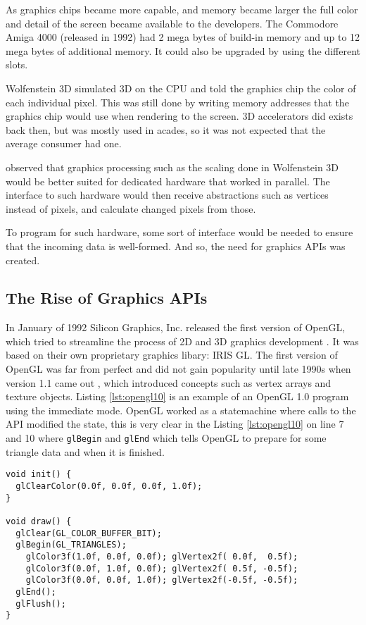 As graphics chips became more capable, and memory became larger the full color and detail of the screen became available to the developers.
The Commodore Amiga 4000 (released in 1992) had 2 mega bytes of build-in memory and up to 12 mega bytes of additional memory.
It could also be upgraded by using the different slots.

Wolfenstein 3D simulated 3D on the \gls{CPU} and told the graphics chip the color of each individual pixel.
This was still done by writing memory addresses that the graphics chip would use when rendering to the screen.
3D accelerators did exists back then, but was mostly used in acades, so it was not expected that the average consumer had one.

 observed that graphics processing such as the scaling done in Wolfenstein 3D would be better suited for dedicated hardware that worked in parallel.
The interface to such hardware would then receive abstractions such as vertices instead of pixels, and calculate changed pixels from those.

To program for such hardware, some sort of interface would be needed to ensure that the incoming data is well-formed.
And so, the need for graphics \glspl{API} was created.


\subsection{The Rise of Graphics \acs{API}s} 

In January of 1992 Silicon Graphics, Inc. released the first version of OpenGL, which tried to streamline the process of 2D and 3D graphics development \cite{segal1994opengl}.
It was based on their own proprietary graphics libary: \gls{IRIS GL}.
The first version of OpenGL was far from perfect and did not gain popularity until late 1990s when version 1.1 came out \cite{kronos????history}, which introduced concepts such as vertex arrays and texture objects.
Listing \ref{lst:opengl10} is an example of an OpenGL 1.0 program using the immediate mode.
OpenGL worked as a statemachine where calls to the \gls{API} modified the state, this is very clear in the Listing \ref{lst:opengl10} on line 7 and 10 where \texttt{glBegin} and \texttt{glEnd} which tells OpenGL to prepare for some triangle data and when it is finished.

\begin{lstlisting}[language={[ANSI]C}, caption={OpenGL 1.0 program written in C, that renders a triangle with different colors on the points, and linear interpolation between the colors. This method uses the fixed pipeline to render the triangle. A method which has been deprecated since OpenGL 3.0.}, label={lst:opengl10}]
void init() {
  glClearColor(0.0f, 0.0f, 0.0f, 1.0f);
}

void draw() {
  glClear(GL_COLOR_BUFFER_BIT);
  glBegin(GL_TRIANGLES);
    glColor3f(1.0f, 0.0f, 0.0f); glVertex2f( 0.0f,  0.5f);
    glColor3f(0.0f, 1.0f, 0.0f); glVertex2f( 0.5f, -0.5f);
    glColor3f(0.0f, 0.0f, 1.0f); glVertex2f(-0.5f, -0.5f);
  glEnd();
  glFlush();
}
\end{lstlisting}

